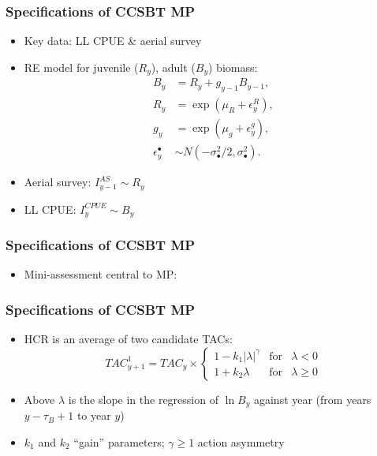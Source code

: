 \documentclass{beamer}
\newcommand{\ds}{\displaystyle}
\newcommand{\eps}{\epsilon}
\begin{document}
\begin{frame}
    \frametitle{Specifications of CCSBT MP}
\begin{itemize}
    \item Key data: LL CPUE \& aerial survey
    \item RE model for juvenile ($R_y$), adult ($B_y$) biomass:
        \begin{align*}
            \ds B_{y} &= R_{y}+g_{y-1}B_{y-1},\\ 
            \ds R_y &= \exp\left(\mu_R+\eps^R_y\right),\\
            \ds g_y &= \exp\left(\mu_g+\eps^g_y\right),\\
            \ds \eps^\bullet_y &\sim N\left(-\sigma^2_\bullet/2,\sigma^2_\bullet\right).
        \end{align*}
    \item Aerial survey: $I^{AS}_{y-1}\sim R_y$
    \item LL CPUE: $I^{CPUE}_y\sim B_y$
\end{itemize}
\end{frame}
\begin{frame}
    \frametitle{Specifications of CCSBT MP}
\begin{itemize}
    \item Mini-assessment central to MP:
\begin{figure}
\begin{center}
\hspace{-1cm}
\end{center}
\end{figure}
\end{itemize}
\end{frame}
\begin{frame}
    \frametitle{Specifications of CCSBT MP}
\begin{itemize}
    \item HCR is an average of two candidate TACs:
        \begin{equation*}
            \ds TAC^1_{y+1}=TAC_y\times \left\{\begin{array}{rcl}\ds{1-k_1|\lambda|^{\gamma}} & \mbox{for} & \lambda<0\\[0.35cm]
\ds{1+k_2\lambda} & \mbox{for} & \lambda\geq 0 
    \end{array}\right.
        \end{equation*}
    \item Above $\lambda$ is the slope in the regression of $\ln B_y$ against year (from years $y-\tau_B+1$ to year $y$)
    \item $k_1$ and $k_2$ ``gain'' parameters; $\gamma\geq1$ action asymmetry
\end{itemize}
\end{frame}
\end{document}
